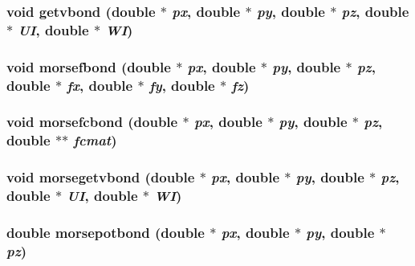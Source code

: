 \subsubsection{\setlength{\rightskip}{0pt plus 5cm}void getvbond (double $\ast$ {\em px}, double $\ast$ {\em py}, double $\ast$ {\em pz}, double $\ast$ {\em UI}, double $\ast$ {\em WI})}\label{md__fmorse_8c_3e5addbe68c6589a438d833b111b220d}


\subsubsection{\setlength{\rightskip}{0pt plus 5cm}void morsefbond (double $\ast$ {\em px}, double $\ast$ {\em py}, double $\ast$ {\em pz}, double $\ast$ {\em fx}, double $\ast$ {\em fy}, double $\ast$ {\em fz})}\label{md__fmorse_8c_b208a7cf9dc7a60e4c2ff4c0fdf5c6fd}


\subsubsection{\setlength{\rightskip}{0pt plus 5cm}void morsefcbond (double $\ast$ {\em px}, double $\ast$ {\em py}, double $\ast$ {\em pz}, double $\ast$$\ast$ {\em fcmat})}\label{md__fmorse_8c_f0dd4a26f4996a0d4b1bfb3a0ffa3154}


\subsubsection{\setlength{\rightskip}{0pt plus 5cm}void morsegetvbond (double $\ast$ {\em px}, double $\ast$ {\em py}, double $\ast$ {\em pz}, double $\ast$ {\em UI}, double $\ast$ {\em WI})}\label{md__fmorse_8c_bec87897f185dd4c78d056cadad134e9}


\subsubsection{\setlength{\rightskip}{0pt plus 5cm}double morsepotbond (double $\ast$ {\em px}, double $\ast$ {\em py}, double $\ast$ {\em pz})}\label{md__fmorse_8c_d90e004175cf4edb2f68906330307399}


